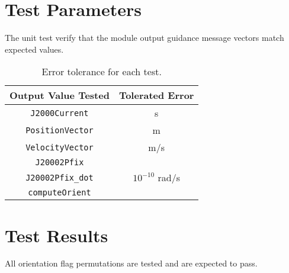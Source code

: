 \section{Test Parameters}
The unit test verify that the module output guidance message vectors match expected values.
\begin{table}[htbp]
	\caption{Error tolerance for each test.}
	\label{tab:errortol}
	\centering \fontsize{10}{10}\selectfont
	\begin{tabular}{ c | c } %
		\hline\hline
		\textbf{Output Value Tested}  & \textbf{Tolerated Error}  \\ 
		\hline
		{\tt J2000Current}        &  s   \\ 
		{\tt PositionVector}        &  m   \\ 
		{\tt VelocityVector}        &  m/s   \\ 
		{\tt J20002Pfix}        &     \\ 
		{\tt J20002Pfix\_dot}        & $10^{-10}$ rad/s   \\ 
		{\tt computeOrient}        &     \\ 
		\hline\hline
	\end{tabular}
\end{table}




\section{Test Results}
All orientation flag permutations are tested and are expected to pass.

